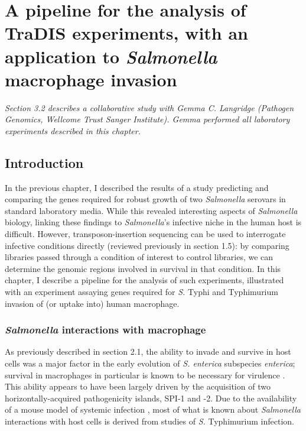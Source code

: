 
\chapter{A pipeline for the analysis of TraDIS experiments, with an application to {\it Salmonella} macrophage invasion}
\label{sec:chapterPingpong}
\ifpdf
    \graphicspath{{Chapter3/Chapter3Figs/EPS/}{Chapter3/Chapter3Figs/}}
\fi

\textit{Section 3.2 describes a collaborative study with Gemma C. Langridge (Pathogen Genomics, Wellcome Trust Sanger Institute). Gemma performed all laboratory experiments described in this chapter.}

\section{Introduction}

In the previous chapter, I described the results of a study predicting and comparing the genes required for robust growth of two \textit{Salmonella} serovars in standard laboratory media. While this revealed interesting aspects of \textit{Salmonella} biology, linking these findings to \textit{Salmonella}'s infective niche in the human host is difficult. However, transposon-insertion sequencing can be used to interrogate infective conditions directly (reviewed previously in section 1.5): by comparing libraries passed through a condition of interest to control libraries, we can determine the genomic regions involved in survival in that condition. In this chapter, I describe a pipeline for the analysis of such experiments, illustrated with an experiment assaying genes required for \textit{S.} Typhi and Typhimurium invasion of (or uptake into) human macrophage.

\subsection{\textit{Salmonella} interactions with macrophage}

As previously described in section 2.1, the ability to invade and survive in host cells was a major factor in the early evolution of \textit{S. enterica} subspecies \textit{enterica}; survival in macrophages in particular is known to be necessary for virulence \parencite{Fields1986}. This ability appears to have been largely driven by the acquisition of two horizontally-acquired pathogenicity islands, SPI-1 and -2. Due to the availability of a mouse model of systemic infection \parencite{Santos2001}, most of what is known about \textit{Salmonella} interactions with host cells is derived from studies of \textit{S.} Typhimurium infection.


